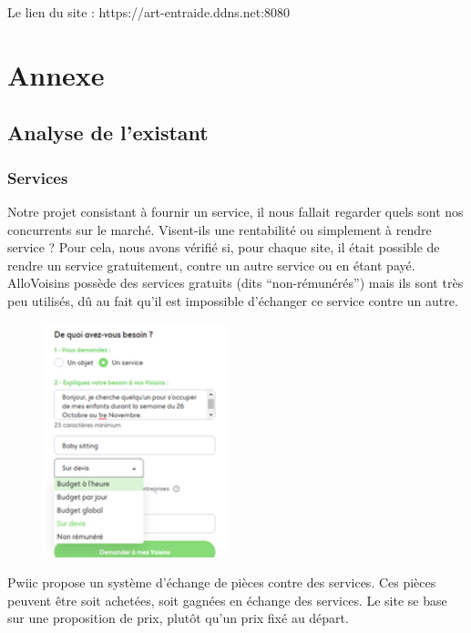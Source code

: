 \documentclass[a4paper,11pt]{article}
\begin{document}
Le lien du site : https://art-entraide.ddns.net:8080


\newpage




\section{Annexe}

\subsection{Analyse de l'existant}

\subsubsection{Services}

Notre projet consistant à fournir un service, il nous fallait regarder quels sont nos concurrents sur le marché.
Visent-ils une rentabilité ou simplement à rendre service ? Pour cela, nous avons vérifié si, pour chaque site,
il était possible de rendre un service gratuitement, contre un autre service ou en étant payé.\\

AlloVoisins possède des services gratuits (dits “non-rémunérés”) mais ils sont très peu utilisés,
dû au fait qu’il est impossible d’échanger ce service contre un autre.\\

\begin{figure}[H]
  \includegraphics[width=200px]{images/services-allovoisins.png}
  \label{fig:services-allovoisins}
\end{figure}

Pwiic propose un système d’échange de pièces contre des services. Ces pièces peuvent être soit achetées,
soit gagnées en échange des services. Le site se base sur une proposition de prix, plutôt qu’un prix fixé au départ.\\
\end{document}
